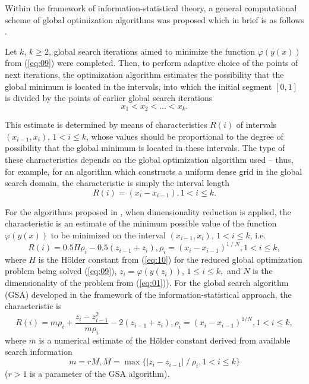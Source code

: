 \documentclass[runningheads]{llncs}
\begin{document}
Within the framework of information-statistical theory, a general computational scheme of global optimization algorithms was proposed which in brief is as follows \cite{c15,c30,c35}.

Let $k$, $k \geq 2$, global search iterations aimed to minimize the function $\varphi(y(x))$ from (\ref{eq:09}) were completed. Then, to perform adaptive choice of the points of next iterations, the optimization algorithm estimates the possibility that the global minimum is located  in the intervals, into which the initial segment $[0,1]$ is divided by the points of earlier global search  iterations
\begin{equation}
\label{eq:11}
x_1<x_2< \dots <x_k.
\end{equation}

This estimate is determined by means of characteristics $R(i)$ of intervals $(x_{i-1},x_i)$, $1 < i \leq k$, whose values should be proportional to the degree of possibility that the global minimum is located  in these intervals. The type of these characteristics depends on the global optimization algorithm used -- thus, for example, for an algorithm which constructs a uniform dense grid in the global search domain, the characteristic is simply the interval length 
\begin{equation}
\label{eq:12}
R(i)=(x_i-x_{i-1}), 1 < i \leq k.
\end{equation}


For the algorithms proposed in \cite{c22,c23}, when dimensionality reduction is applied, the characteristic is an estimate of the minimum possible value of the function $\varphi(y(x))$ to be minimized on the interval $(x_{i-1},x_i )$, $1 < i \leq k$, i.e.
\begin{equation}
\label{eq:13}
R(i) = 0.5 H \rho_i - 0.5 (z_{i-1} + z_i ), \rho_i = (x_i-x_{i-1} ) ^ {1⁄N}, 1 < i \leq k,
\end{equation}
where $H$ is the H{\" o}lder constant from (\ref{eq:10}) for the reduced global optimization problem being solved (\ref{eq:09}), $z_i = \varphi(y(z_i))$, $1 \leq i \leq k,$ and $N$ is the dimensionality of the problem from (\ref{eq:01})).  For the global search algorithm (GSA) \cite{c15,c24} developed in the framework of the information-statistical approach, the characteristic is
\begin{equation}
\label{eq:14}
R(i)=m\rho_i+\frac{z_i-z_{i-1}^2}{m\rho_i}-2(z_{i-1}+z_i ),\rho_i=(x_i-x_{i-1})^{1/N}, 1 < i \leq k,
\end{equation}
where $m$ is a numerical estimate of the H{\" o}lder constant derived from available search information
\begin{equation}
\label{eq:15}
m= r M, M = \max \{ |z_i-z_{i-1} | ⁄ \rho_i, 1 < i \leq  k \}
\end{equation}
 ($r>1$ is a parameter of the GSA algorithm).
\end{document}
